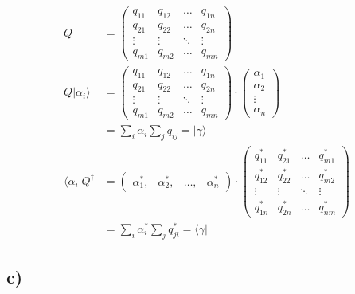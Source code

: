     \begin{align*}
        Q &=
        \begin{pmatrix}
        q_{11} & q_{12} & \ldots & q_{1n}\\
        q_{21} & q_{22} & \ldots & q_{2n}\\
        \vdots & \vdots & \ddots & \vdots\\
        q_{m1} & q_{m2} & \ldots & q_{mn}
        \end{pmatrix}\\
        Q \vert \alpha_i \rangle &=
        \begin{pmatrix}
        q_{11} & q_{12} & \ldots & q_{1n}\\
        q_{21} & q_{22} & \ldots & q_{2n}\\
        \vdots & \vdots & \ddots & \vdots\\
        q_{m1} & q_{m2} & \ldots & q_{mn}
        \end{pmatrix} \cdot 
        \begin{pmatrix}
            \alpha_1\\
            \alpha_2\\
            \vdots\\
            \alpha_n
        \end{pmatrix}\\
        &= \sum_{i} \alpha_i \sum_{j} q_{ij} = \vert \gamma \rangle\\
        \langle \alpha_i \vert Q^{\dagger} &=
        \begin{pmatrix}
            \alpha_1^*, & \alpha_2^*, & \ldots, & \alpha_n^*
        \end{pmatrix} \cdot 
        \begin{pmatrix}
        q_{11}^* & q_{21}^* & \ldots & q_{m1}^*\\
        q_{12}^* & q_{22}^* & \ldots & q_{m2}^*\\
        \vdots & \vdots & \ddots & \vdots\\
        q_{1n}^* & q_{2n}^* & \ldots & q_{nm}^*
        \end{pmatrix}\\
        &= \sum_{i} \alpha_i^* \sum_{j} q_{ji}^* = \langle \gamma \vert
    \end{align*}

\subsection{c)}

